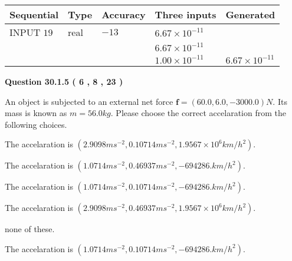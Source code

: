 \documentclass[12pt]{article}
\begin{document}
   
  
  
\noindent\begin{tabular}{|l|l|l|l|l|}
\hline
 Sequential & Type & Accuracy & Three inputs & Generated \\ 
\hline
 
 
  INPUT $           19 $ & real & $          -13  $ & $
 6.67 \times 10^{-11}
  $ & \\
  & & &  $
 6.67 \times 10^{-11}
  $ & \\
  & & &  $
 1.00 \times 10^{-11}
 $ & $ 6.67 \times 10^{-11} $ 
 \\  \hline  
 \end{tabular}
   
   
  
\vspace{0.2in}
  
{\textbf{\Large{Question
30.1.5 
 (           6 ,           8 ,          23 )
}}}
  
  
 
An object is subjected to an external net force $\mathbf{f}=(
60.0 ,
6.0,
-3000.0  )N$. Its mass is known as
$m= %
56.0  kg$. Please choose the correct accelaration
from the following choices.
 
 
 
The accelaration is
$(
2.9098ms^{-2},
0.10714ms^{-2},
1.9567 \times 10^{6}km/h^2
).
$
 
 
The accelaration is
$(
1.0714ms^{-2},
0.46937ms^{-2},
-694286.km/h^2
).
$
 
 
The accelaration is
$(
1.0714ms^{-2},
0.10714ms^{-2},
-694286.km/h^2
).
$
 
 
The accelaration is
$(
2.9098ms^{-2},
0.46937ms^{-2},
1.9567 \times 10^{6}km/h^2
).
$
 
 
none of these.
 
 
\noindent{}
 
 
The accelaration is
$(
1.0714ms^{-2},
0.10714ms^{-2},
-694286.km/h^2
).
$
 
 
\noindent{}
 
 
 
 
 
 
\noindent{}
 
\end{document}
